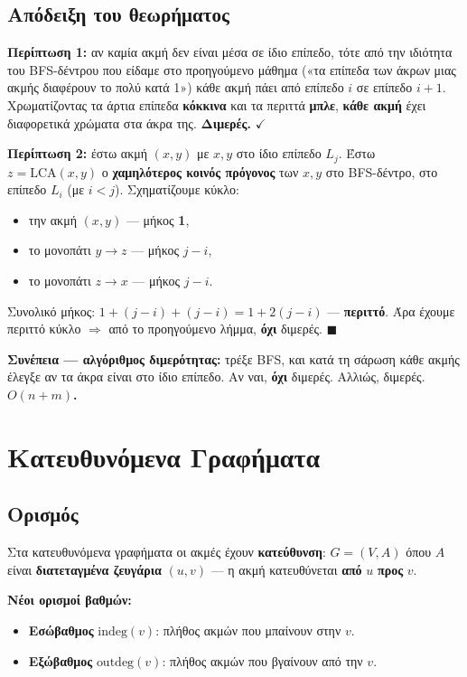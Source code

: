\documentclass[11pt,a4paper]{article}
\begin{document}
\subsection{Απόδειξη του θεωρήματος}

\textbf{Περίπτωση 1:} αν καμία ακμή δεν είναι μέσα σε ίδιο επίπεδο, τότε από την
ιδιότητα του BFS-δέντρου που είδαμε στο προηγούμενο μάθημα («τα επίπεδα των άκρων
μιας ακμής διαφέρουν το πολύ κατά 1») κάθε ακμή πάει από επίπεδο $i$ σε επίπεδο
$i+1$. Χρωματίζοντας τα άρτια επίπεδα \textbf{κόκκινα} και τα περιττά
\textbf{μπλε}, \textbf{κάθε ακμή} έχει διαφορετικά χρώματα στα άκρα της.
\textbf{Διμερές.} $\checkmark$

\textbf{Περίπτωση 2:} έστω ακμή $(x, y)$ με $x, y$ στο ίδιο επίπεδο $L_j$. Έστω
$z = \text{LCA}(x, y)$ ο \textbf{χαμηλότερος κοινός πρόγονος} των $x, y$ στο
BFS-δέντρο, στο επίπεδο $L_i$ (με $i < j$). Σχηματίζουμε κύκλο:
\begin{itemize}
  \item την ακμή $(x, y)$ --- μήκος \textbf{1},
  \item το μονοπάτι $y \to z$ --- μήκος $j - i$,
  \item το μονοπάτι $z \to x$ --- μήκος $j - i$.
\end{itemize}
Συνολικό μήκος: $1 + (j - i) + (j - i) = 1 + 2(j - i)$ --- \textbf{περιττό}. Άρα
έχουμε περιττό κύκλο $\Rightarrow$ από το προηγούμενο λήμμα, \textbf{όχι}
διμερές. $\blacksquare$

\begin{keypoint}
\textbf{Συνέπεια --- αλγόριθμος διμερότητας:} τρέξε BFS, και κατά τη σάρωση κάθε
ακμής έλεγξε αν τα άκρα είναι στο ίδιο επίπεδο. Αν ναι, \textbf{όχι} διμερές.
Αλλιώς, διμερές. \textbf{$O(n + m)$.}
\end{keypoint}

\section{Κατευθυνόμενα Γραφήματα}

\subsection{Ορισμός}

Στα κατευθυνόμενα γραφήματα οι ακμές έχουν \textbf{κατεύθυνση}: $G = (V, A)$ όπου
$A$ είναι \textbf{διατεταγμένα ζευγάρια} $(u, v)$ --- η ακμή κατευθύνεται
\textbf{από} $u$ \textbf{προς} $v$.

\textbf{Νέοι ορισμοί βαθμών:}
\begin{itemize}
  \item \textbf{Εσώβαθμος} $\text{indeg}(v)$: πλήθος ακμών που μπαίνουν στην $v$.
  \item \textbf{Εξώβαθμος} $\text{outdeg}(v)$: πλήθος ακμών που βγαίνουν από την
  $v$.
\end{itemize}
\end{document}
